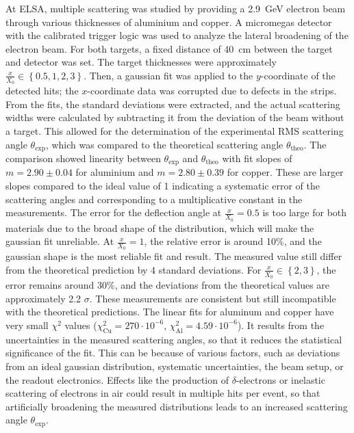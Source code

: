 \documentclass[sn-mathphys-num,iicol]{sn-jnl}
\theoremstyle{thmstyleone}
\theoremstyle{thmstyletwo}
\theoremstyle{thmstylethree}
\begin{document}
At ELSA, multiple scattering was studied by providing a \SI{2.9}{GeV} electron beam through various thicknesses of aluminium and copper. 
A micromegas detector with the calibrated trigger logic was used to analyze the lateral broadening of the electron beam. 
For both targets, a fixed distance of \SI{40}{\centi\meter} between the target and detector was set. 
The target thicknesses were approximately $\tfrac{x}{X_0} \in \left\{0.5,1,2,3\right\}$. 
Then, a gaussian fit was applied to the $y$-coordinate of the detected hits; the $x$-coordinate data was corrupted due to defects in the strips.
From the fits, the standard deviations were extracted, and the actual scattering widths were calculated by subtracting it from the deviation of the beam without a target. 
This allowed for the determination of the experimental RMS scattering angle $\theta_{\text{exp}}$, which was compared to the theoretical scattering angle $\theta_{\text{theo}}$.
The comparison showed linearity between $\theta_{\text{exp}}$ and $\theta_{\text{theo}}$ with fit slopes of $m = 2.90 \pm 0.04$ for aluminium and $m = 2.80 \pm 0.39$ for copper. 
These are larger slopes compared to the ideal value of 1 indicating a systematic error of the scattering angles and corresponding to a multiplicative constant in the measurements.
The error for the deflection angle at $\tfrac{x}{X_0}=0.5$ is too large for both materials due to the broad shape of the distribution, which will make the gaussian fit unreliable. 
At $\tfrac{x}{X_0} = 1$, the relative error is around 10\%, and the gaussian shape is the most reliable fit and result. 
The measured value still differ from the theoretical prediction by 4 standard deviations. For $\tfrac{x}{X_0} \in \left\{2,3\right\}$, the error remains around 30\%, and the deviations from the theoretical values are approximately 2.2 $\sigma$. 
These measurements are consistent but still incompatible with the theoretical predictions.
The linear fits for aluminum and copper have very small \(\chi^2\) values (\(\chi^2_{\text{Cu}} = 270 \cdot 10^{-6}\), \(\chi^2_{\text{Al}} = 4.59 \cdot 10^{-6}\)). 
It results from the uncertainties in the measured scattering angles, so that it reduces the statistical significance of the fit. 
This can be because of various factors, such as deviations from an ideal gaussian distribution, systematic uncertainties, the beam setup, or the readout electronics. 
Effects like the production of \(\delta\)-electrons or inelastic scattering of electrons in air could result in multiple hits per event, so that artificially broadening the measured distributions leads to an increased scattering angle \(\theta_{\text{exp}}\).
\end{document}
